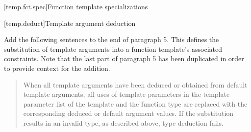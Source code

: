 [temp.fct.spec]{Function template specializations}

\setcounter{subsection}{1}
[temp.deduct]{Template argument deduction}

Add the following sentences to the end of paragraph 5. This defines
the substitution of template arguments into a function template's
associated constraints. Note that the last part of paragraph 5
has been duplicated in order to provide context for the addition.

\begin{quote}
\setcounter{Paras}{4}
\pnum
When all template arguments have been deduced or obtained from default 
template arguments, all uses of template parameters in the template 
parameter list of the template and the function type are replaced with
the corresponding deduced or default argument values. 
% 
If the substitution results in an invalid type, as described above, type 
deduction fails.
% 
\end{quote}
